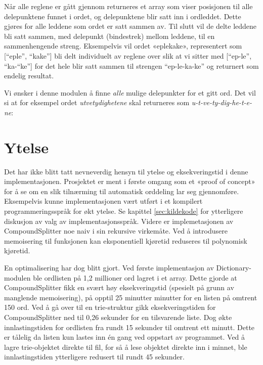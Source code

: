 Når alle reglene er gått gjennom returneres et array som viser posisjonen til alle delepunktene funnet i ordet, og delepunktene blir satt inn i ordleddet. Dette gjøres for alle leddene som ordet er satt sammen av. Til slutt vil de delte leddene bli satt sammen, med delepunkt (bindestrek) mellom leddene, til en sammenhengende streng. Eksempelvis vil ordet «eplekake», representert som [“eple”, “kake”] bli delt individuelt av reglene over slik at vi sitter med [“ep-le”, “ka-“ke”] for det hele blir satt sammen til strengen “ep-le-ka-ke” og returnert som endelig resultat.

Vi ønsker i denne modulen å finne \textit{alle} mulige delepunkter for et gitt ord. Det vil si at for eksempel ordet \textit{utvetydighetene} skal returneres som \textit{u-t-ve-ty-dig-he-t-e-ne}:

\newline
{}\newline
{}\newline
{}\newline
{}


\section{Ytelse}

Det har ikke blitt tatt nevneverdig hensyn til ytelse og eksekveringstid i denne implementasjonen. Prosjektet er ment i første omgang som et «proof of concept» for å se om en slik tilnærming til automatisk orddeling lar seg gjennomføre. Eksempelvis kunne implementasjonen vært utført i et kompilert programmeringsspråk for økt ytelse. Se kapittel \ref{sec:kildekode} for ytterligere diskusjon av valg av implementasjonsspråk. Videre er implemetasjonen av CompoundSplitter noe naiv i sin rekursive virkemåte. Ved å introdusere memoisering til funksjonen kan eksponentiell kjøretid reduseres til polynomisk kjøretid.

En optimalisering har dog blitt gjort. Ved første implementasjon av Dictionary-modulen ble ordlisten på 1,2 millioner ord lagret i et array. Dette gjorde at CompoundSplitter fikk en svært høy eksekveringstid (spesielt på grunn av manglende memoisering), på opptil 25 minutter minutter for en listen på omtrent 150 ord. Ved å gå over til en trie-struktur gikk eksekveringstiden for CompoundSplitter ned til 0,26 sekunder for en tilsvarende liste. Dog økte innlastingstiden for ordlisten fra rundt 15 sekunder til omtrent ett minutt. Dette er tålelig da listen kun lastes inn én gang ved oppstart av programmet. Ved å lagre trie-objektet direkte til fil, for så å lese objektet direkte inn i minnet, ble innlastingstiden ytterligere redusert til rundt 45 sekunder.



